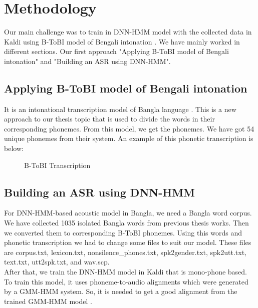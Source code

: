 \documentclass{standalone}
\begin{document}
\chapter{Methodology}
Our main challenge was to train in DNN-HMM model with the collected data in Kaldi using B-ToBI  model of Bengali intonation \cite{khan2016intonation}. We have mainly worked in different sections. Our first approach "Applying B-ToBI model of Bengali intonation" and "Building an ASR using DNN-HMM".

\section{Applying B-ToBI model of Bengali intonation}
It is an intonational transcription model of Bangla language \cite{khan2016intonation}. This is a new approach to our thesis topic that is used to divide the words in their corresponding phonemes.
From this model, we get the phonemes. We have got 54 unique phonemes from their system. An example of this phonetic transcription is below:
\\

\begin{figure}[h]
   \centering
   \caption{B-ToBI Transcription}
  \label{fig:B-ToBI-transcription}
\end{figure}

\section{Building an ASR using DNN-HMM}
For DNN-HMM-based acoustic model in Bangla, we need a Bangla word corpus. We have collected 1035 isolated Bangla words from previous thesis works. Then we converted them to corresponding B-ToBI phonemes. Using this words and phonetic transcription we had to change some files to suit our model. These files are corpus.txt, lexicon.txt, nonsilence\_phones.txt, spk2gender.txt, spk2utt.txt, text.txt, utt2spk.txt, and wav.scp.
\\
After that, we train the DNN-HMM model in Kaldi that is mono-phone based. To train this model, it uses phoneme-to-audio alignments which were generated by a GMM-HMM system. So, it is needed to get a good alignment from the trained GMM-HMM model \cite{rabiner1989tutorial}.
\\
\end{document}
